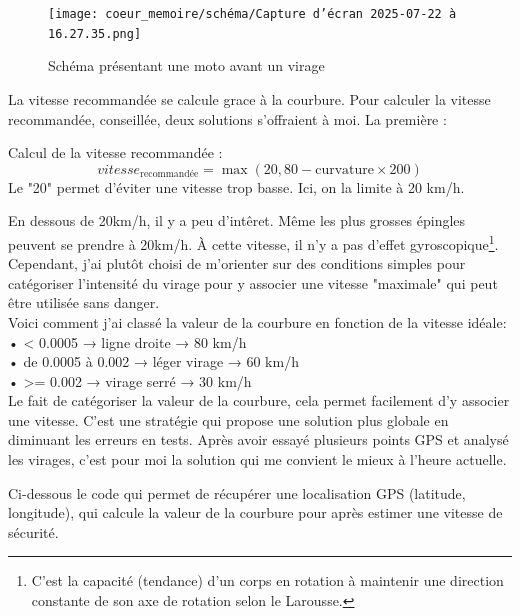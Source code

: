 \begin{figure}[H]
    \centering
    \texttt{[image: coeur\_memoire/schéma/Capture d’écran 2025-07-22 à 16.27.35.png]} 
    \caption{Schéma présentant une moto avant un virage}
    \label{schemaviragepoint}
\end{figure}



La vitesse recommandée se calcule grace à la courbure. Pour calculer la vitesse recommandée, conseillée, deux solutions s'offraient à moi. La première : \\
\begin{tcolorbox}[title=Vitesse recommandée]
Calcul de la vitesse recommandée :
\[
vitesse_{\text{recommandée}} = \max(20, 80-\text{curvature} \times 200)
\]
Le "20" permet d'éviter une vitesse trop basse. Ici, on la limite à 20 km/h.

\end{tcolorbox}

En dessous de 20km/h, il y a peu d'intêret. Même les plus grosses épingles peuvent se prendre à 20km/h. À cette vitesse, il n'y a pas d'effet gyroscopique\footnote{C'est la capacité (tendance) d'un corps en rotation à maintenir une direction constante de son axe de rotation selon le Larousse.}.
Cependant, j'ai plutôt choisi de m'orienter sur des conditions simples pour catégoriser l'intensité du virage pour y associer une vitesse "maximale" qui peut être utilisée sans danger.\\
\vspace{0.5cm}
Voici comment j'ai classé la valeur de la courbure en fonction de la vitesse idéale: \\
•	< 0.0005 → ligne droite → 80 km/h \\
•	de 0.0005 à 0.002 → léger virage → 60 km/h\\
•	>= 0.002 → virage serré → 30 km/h\\
\vspace{0.5cm}
Le fait de catégoriser la valeur de la courbure, cela permet facilement d'y associer une vitesse. C'est une stratégie qui propose une solution plus globale en diminuant les erreurs en tests. Après avoir essayé plusieurs points GPS et analysé les virages, c'est pour moi la solution qui me convient le mieux à l'heure actuelle.
\vspace{0.5cm}


\vspace{0.5cm}
Ci-dessous le code qui permet de récupérer une localisation GPS (latitude, longitude), qui calcule la valeur de la courbure pour après estimer une vitesse de sécurité.


